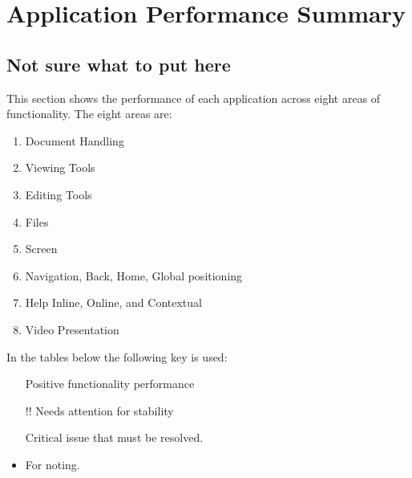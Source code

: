 

\appen
{}

\section{Application Performance Summary}
\subsection{Not sure what to put here}
This section shows the performance of each application across eight areas of functionality. The eight areas are:
\begin{enumerate}
    \item Document Handling
    \item Viewing Tools
    \item Editing Tools
    \item Files
    \item Screen
    \item Navigation, Back, Home, Global positioning
    \item Help Inline, Online, and Contextual
    \item Video Presentation
    
    
\end{enumerate}

In the tables below the following key is used:
\begin{itemize}
\item[\color{green}\tick]\color{black } Positive functionality performance
    \item [\color{amber}!!]\color{black} Needs attention for stability
     \item [\color{red}\cross]\color{black} Critical issue that must be resolved.
     \item For noting.
\end{itemize}
